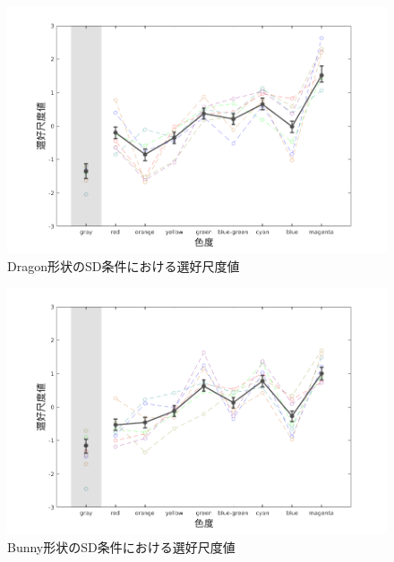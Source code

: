         \begin{figure}[h]
            \centering
            \includegraphics[width=14.0cm]{./img/ex1_res_DSD_p.png}
            \caption{Dragon形状のSD条件における選好尺度値}
            \label{ex1_DSD}
        \end{figure}

        \begin{figure}[h]
            \centering
            \includegraphics[width=14.0cm]{./img/ex1_res_BSD_p.png}
            \caption{Bunny形状のSD条件における選好尺度値}
            \label{ex1_BSD}
        \end{figure}

